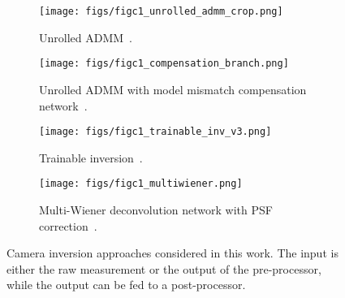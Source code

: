 \begin{figure*}[t!]
    \centering
    \begin{subfigure}{0.48\linewidth}
		\centering
        \texttt{[image: figs/figc1\_unrolled\_admm\_crop.png]} 
		\caption{Unrolled ADMM~\cite{Monakhova:19}.}
		\label{fig:unrolled_admm}
	\end{subfigure}
 \begin{subfigure}{0.5\linewidth}
		\centering
        \texttt{[image: figs/figc1\_compensation\_branch.png]} 
		\caption{Unrolled ADMM with model mismatch compensation network~\cite{9546648}.}
		\label{fig:compensation_branch}
	\end{subfigure}
    \hspace{2cm}
	\begin{subfigure}{0.48\linewidth}
		\centering
		\texttt{[image: figs/figc1\_trainable\_inv\_v3.png]} 
		\caption{Trainable inversion~\cite{9239993}.}
		\label{fig:trainable_inv}
	\end{subfigure}
	\begin{subfigure}{0.5\linewidth}
		\centering
		\texttt{[image: figs/figc1\_multiwiener.png]} 
		\caption{Multi-Wiener deconvolution network with PSF correction~\cite{Li:23}.}
		\label{fig:multiwiener}
	\end{subfigure}
	\caption{Camera inversion approaches considered in this work. The input is either the raw measurement or the output of the pre-processor, while the output can be fed to a post-processor.
 }
	\label{fig:camera_inv_arch}
\end{figure*}

